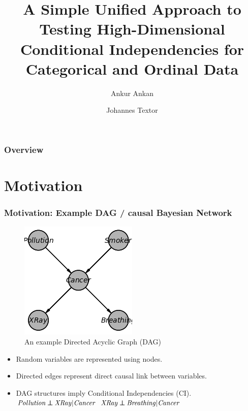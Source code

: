 \documentclass{beamer}
\def\ci{\perp\!\!\!\!\!\perp}
\begin{document}
\title{A Simple Unified Approach to Testing High-Dimensional Conditional
Independencies for Categorical and Ordinal Data}
\author {Ankur Ankan \and Johannes Textor}
\date{}
\maketitle

\begin{frame}
	\frametitle{Overview}
	\tableofcontents
\end{frame}

\section{Motivation}
\begin{frame}
	\frametitle{Motivation: Example DAG / causal Bayesian Network}
	\begin{figure}
		\centering
		\includegraphics[scale=0.6]{imgs/example_dag.png}
		\caption*{An example Directed Acyclic Graph (DAG)}
	\end{figure}
	\begin{itemize}
		\setlength\itemsep{1em}
		\item Random variables are represented using nodes.
		\item Directed edges represent direct causal link between variables.
		\item DAG structures imply Conditional Independencies (CI).
			\hspace*{20pt} $ \text{\emph{Pollution}} \ci \text{\emph{XRay}} | \text{\emph{Cancer}} $ \newline
			\hspace*{20pt} $ \text{\emph{XRay}} \ci \text{\emph{Breathing}} | \text{\emph{Cancer}} $
	\end{itemize}
\end{frame}
\end{document}
